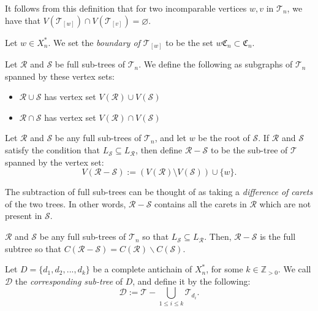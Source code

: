 \documentclass[12pt]{amsart}
\newcommand{\seteq}{:=}
\newcommand{\T}{\mathcal{T}}
\newcommand{\tn}{\T_n}
\newcommand{\D}{\mathcal{D}}
\newcommand{\R}{\mathcal{R}}
\newcommand{\s}{\mathcal{S}}
\newcommand{\xns}{X_n^*}
\newcommand{\Cn}{\mathfrak{C}_n}
\begin{document}
        \begin{remark}
            It follows from this definition that for two incomparable vertices $ w , v $ in $\tn$, we have that $V(\T_{ [w] })\cap V(\T_{ [v] })=\varnothing$.
        \end{remark}
        
        \begin{definition}
            Let $w\in\xns$.  We set the \emph{boundary of $\T_{[w]}$} to be the set $w\Cn\subset \Cn$.
        \end{definition}
        
        \begin{definition}
            Let $\R$ and $\s$ be full sub-trees of $\tn$. We define the following as subgraphs of $\tn$ spanned by these vertex sets:
            \begin{itemize}
                \item $\R\cup\s$ has vertex set $V(\R)\cup V(\s)$
                \item $\R\cap\s$ has vertex set $V(\R)\cap V(\s)$
            \end{itemize}
        \end{definition}
        
        \begin{definition}[Subtraction]
            Let $\R$ and $\s$ be any full sub-trees of $\tn$, and let $ w $ be the root of $\s$. If $\R$ and $\s$ satisfy the condition that $L_\s\subseteq L_\R$, then define $\R -\s$ to be the sub-tree of $\T$ spanned by the vertex set: $$V(\R -\s)\seteq (V(\R)\setminus V(\s))\cup \{ w \}.$$
        \end{definition}
        
        \begin{remark}
            The subtraction of full sub-trees can be thought of as taking a \textit{difference of carets} of the two trees. In other words, $\R-\s$ contains all the carets in $\R$ which are not present in $\s$.
        \end{remark}
        
        \begin{lemma}
        $\R$ and $\s$ be any full sub-trees of $\tn$ so that $L_\s\subseteq L_\R$.  Then, $\R-\s$ is the full subtree so that $C(\R-\s)=C(\R)\backslash C(\s)$. 
        \end{lemma}
        
        \begin{definition}
            Let $D=\{d_1, d_2, ..., d_k\}$ be a complete antichain of $\xns$, for some $k \in \mathbb{Z}_{>0}$. We call $\D$ the \textit{corresponding sub-tree} of $D$, and define it by the following: $$\D\seteq\T -\bigcup_{1\leq i\leq k} \T_{d_i}.$$
        \end{definition}
        
\end{document}
